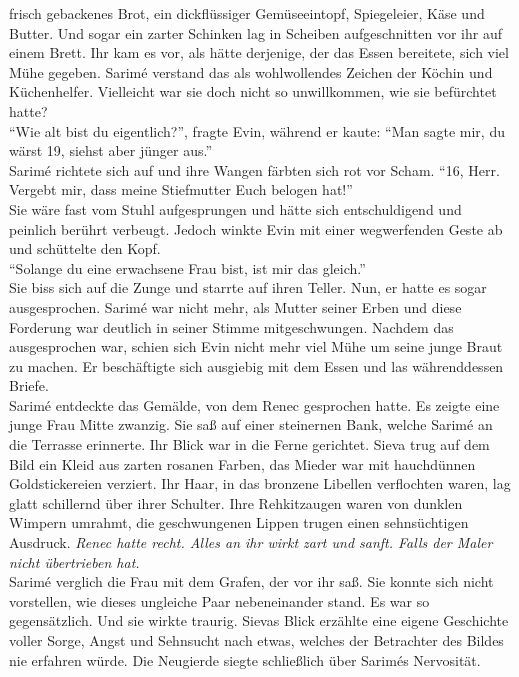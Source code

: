 frisch gebackenes Brot, ein dickflüssiger Gemüseeintopf, Spiegeleier, Käse und Butter. Und sogar 
ein zarter Schinken lag in Scheiben aufgeschnitten vor ihr auf einem Brett. Ihr kam es vor, als 
hätte derjenige, der das Essen bereitete, sich viel Mühe gegeben. Sarimé verstand das als 
wohlwollendes Zeichen der Köchin und Küchenhelfer. Vielleicht war sie doch nicht so unwillkommen, 
wie sie befürchtet hatte?\\
``Wie alt bist du eigentlich?'', fragte Evin, während er kaute: ``Man sagte mir, du wärst 19, 
siehst aber jünger aus.''\\
Sarimé richtete sich auf und ihre Wangen färbten sich rot vor Scham. ``16, Herr. Vergebt mir, dass 
meine Stiefmutter Euch belogen hat!''\\
Sie wäre fast vom Stuhl aufgesprungen und hätte sich entschuldigend und peinlich berührt verbeugt. 
Jedoch winkte Evin mit einer wegwerfenden Geste ab und schüttelte den Kopf.\\
``Solange du eine erwachsene Frau bist, ist mir das gleich.''\\
Sie biss sich auf die Zunge und starrte auf ihren Teller. Nun, er hatte es sogar ausgesprochen. 
Sarimé war nicht mehr, als Mutter seiner Erben und diese Forderung war deutlich in seiner Stimme 
mitgeschwungen. Nachdem das ausgesprochen war, schien sich Evin nicht mehr viel Mühe um seine junge 
Braut zu machen. Er beschäftigte sich ausgiebig mit dem Essen und las währenddessen Briefe.\\
Sarimé entdeckte das Gemälde, von dem Renec gesprochen hatte. Es zeigte eine junge Frau Mitte 
zwanzig. Sie saß auf einer steinernen Bank, welche Sarimé an die Terrasse erinnerte. Ihr Blick war 
in die Ferne gerichtet. Sieva trug auf dem Bild ein Kleid aus zarten rosanen Farben, das Mieder war 
mit hauchdünnen Goldstickereien verziert. Ihr Haar, in das bronzene Libellen verflochten waren, lag 
glatt schillernd über ihrer Schulter. Ihre Rehkitzaugen waren von dunklen Wimpern umrahmt, die 
geschwungenen Lippen trugen einen sehnsüchtigen Ausdruck. \textit{Renec hatte recht. Alles an ihr 
wirkt zart und sanft. Falls der Maler nicht übertrieben hat.}\\
Sarimé verglich die Frau mit dem Grafen, der vor ihr saß. Sie konnte sich nicht vorstellen, wie 
dieses ungleiche Paar nebeneinander stand. Es war so gegensätzlich. Und sie wirkte traurig. Sievas 
Blick erzählte eine eigene Geschichte voller Sorge, Angst und Sehnsucht nach etwas, welches der 
Betrachter des Bildes nie erfahren würde. Die Neugierde siegte schließlich über Sarimés Nervosität. 
